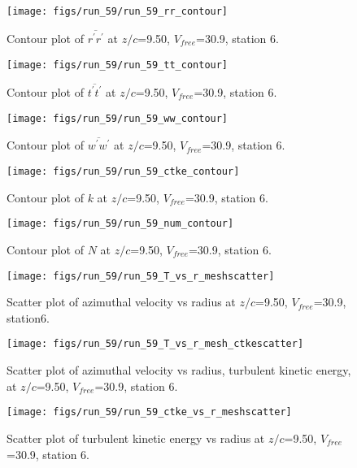 \begin{figure}[H]
\centering
\texttt{[image: figs/run\_59/run\_59\_rr\_contour]}
\caption{Contour plot of $\overline{r^\prime r^\prime}$ at $z/c$=9.50, $V_{free}$=30.9, station 6.}
\label{fig:run_59_rr_contour}
\end{figure}


\begin{figure}[H]
\centering
\texttt{[image: figs/run\_59/run\_59\_tt\_contour]}
\caption{Contour plot of $\overline{t^\prime t^\prime}$ at $z/c$=9.50, $V_{free}$=30.9, station 6.}
\label{fig:run_59_tt_contour}
\end{figure}


\begin{figure}[H]
\centering
\texttt{[image: figs/run\_59/run\_59\_ww\_contour]}
\caption{Contour plot of $\overline{w^\prime w^\prime}$ at $z/c$=9.50, $V_{free}$=30.9, station 6.}
\label{fig:run_59_ww_contour}
\end{figure}


\begin{figure}[H]
\centering
\texttt{[image: figs/run\_59/run\_59\_ctke\_contour]}
\caption{Contour plot of $k$ at $z/c$=9.50, $V_{free}$=30.9, station 6.}
\label{fig:run_59_ctke_contour}
\end{figure}


\begin{figure}[H]
\centering
\texttt{[image: figs/run\_59/run\_59\_num\_contour]}
\caption{Contour plot of $N$ at $z/c$=9.50, $V_{free}$=30.9, station 6.}
\label{fig:run_59_num_contour}
\end{figure}


\begin{figure}[H]
\centering
\texttt{[image: figs/run\_59/run\_59\_T\_vs\_r\_meshscatter]}
\caption{Scatter plot of azimuthal velocity vs radius at $z/c$=9.50, $V_{free}$=30.9, station6.}
\label{fig:run_59_T_vs_r_meshscatter}
\end{figure}


\begin{figure}[H]
\centering
\texttt{[image: figs/run\_59/run\_59\_T\_vs\_r\_mesh\_ctkescatter]}
\caption{Scatter plot of azimuthal velocity vs radius, turbulent kinetic energy, at $z/c$=9.50, $V_{free}$=30.9, station 6.}
\label{fig:run_59_T_vs_r_mesh_ctkescatter}
\end{figure}


\begin{figure}[H]
\centering
\texttt{[image: figs/run\_59/run\_59\_ctke\_vs\_r\_meshscatter]}
\caption{Scatter plot of turbulent kinetic energy vs radius at $z/c$=9.50, $V_{free}$=30.9, station 6.}
\label{fig:run_59_ctke_vs_r_meshscatter}
\end{figure}



